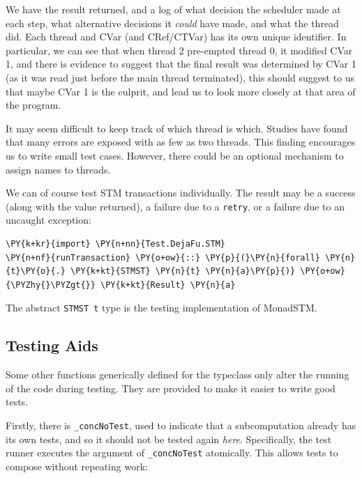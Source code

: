 We have the result returned, and a log of what decision the scheduler
made at each step, what alternative decisions it \textit{could} have
made, and what the thread did. Each thread and CVar (and CRef/CTVar)
has its own unique identifier. In particular, we can see that when
thread 2 pre-empted thread 0, it modified CVar 1, and there is
evidence to suggest that the final result was determined by CVar 1 (as
it was read just before the main thread terminated), this should
suggest to us that maybe CVar 1 is the culprit, and lead us to look
more closely at that area of the program.

It may seem difficult to keep track of which thread is which. Studies
have found\cite{empirical} that many errors are exposed with as few as
two threads. This finding encourages us to write small test cases.
However, there could be an optional mechanism to assign names to
threads.

We can of course test STM transactions individually. The result may be
a success (along with the value returned), a failure due to a
\texttt{retry}, or a failure due to an uncaught exception:


\begin{Verbatim}[commandchars=\\\{\}]
\PY{k+kr}{import} \PY{n+nn}{Test.DejaFu.STM}
\PY{n+nf}{runTransaction} \PY{o+ow}{::} \PY{p}{(}\PY{n}{forall} \PY{n}{t}\PY{o}{.} \PY{k+kt}{STMST} \PY{n}{t} \PY{n}{a}\PY{p}{)} \PY{o+ow}{\PYZhy{}\PYZgt{}} \PY{k+kt}{Result} \PY{n}{a}
\end{Verbatim}

The abstract \texttt{STMST t} type is the testing implementation of
MonadSTM.

\subsection*{Testing Aids}
\label{sec:dejafu-testing-aids}

Some other functions generically defined for the typeclass only alter
the running of the code during testing. They are provided to make it
easier to write good tests.

Firstly, there is \texttt{\_concNoTest}, used to indicate that a
subcomputation already has its own tests, and so it should not be
tested again \textit{here}. Specifically, the test runner executes the
argument of \texttt{\_concNoTest} atomically. This allows tests to
compose without repeating work:

